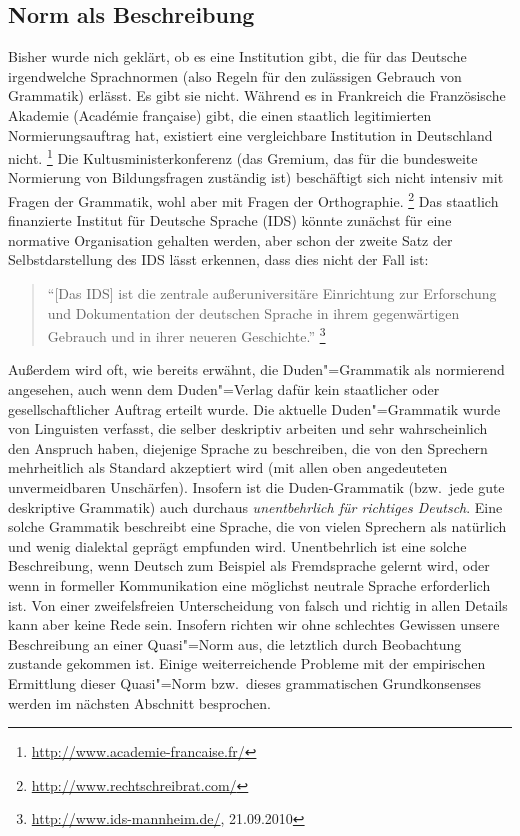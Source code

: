 \subsection{Norm als Beschreibung}

\label{sec:normalsbeschreibung}

Bisher wurde nich geklärt, ob es eine Institution gibt, die für das Deutsche irgendwelche Sprachnormen (also Regeln für den zulässigen Gebrauch von Grammatik) erlässt.
Es gibt sie nicht.
Während es \zB in Frankreich die Französische Akademie (Académie française) gibt, die einen staatlich legitimierten Normierungsauftrag hat, existiert eine vergleichbare Institution in Deutschland nicht.%
\footnote{\raggedright{\url{http://www.academie-francaise.fr/}}}
Die Kultusministerkonferenz (das Gremium, das für die bundesweite Normierung von Bildungsfragen zuständig ist) beschäftigt sich nicht intensiv mit Fragen der Grammatik, wohl aber mit Fragen der Orthographie.%
\footnote{\url{http://www.rechtschreibrat.com/}}
Das staatlich finanzierte Institut für Deutsche Sprache (IDS) könnte zunächst für eine normative Organisation gehalten werden, aber schon der zweite Satz der Selbstdarstellung des IDS lässt erkennen, dass dies nicht der Fall ist:

\begin{quote}
  "`[Das IDS] ist die zentrale außeruniversitäre Einrichtung zur Erforschung und Dokumentation der deutschen Sprache in ihrem gegenwärtigen Gebrauch und in ihrer neueren Geschichte."'%
    \footnote{\raggedright{\url{http://www.ids-mannheim.de/}, 21.09.2010}}
\end{quote}

Außerdem wird oft, wie bereits erwähnt, die Duden"=Grammatik als normierend angesehen, auch wenn dem Duden"=Verlag dafür kein staatlicher oder gesellschaftlicher Auftrag erteilt wurde.
Die aktuelle Duden"=Grammatik wurde von Linguisten verfasst, die selber deskriptiv arbeiten und sehr wahrscheinlich den Anspruch haben, diejenige Sprache zu beschreiben, die von den Sprechern mehrheitlich als Standard akzeptiert wird (mit allen oben angedeuteten unvermeidbaren Unschärfen).
Insofern ist die Duden-Grammatik (bzw.\ jede gute deskriptive Grammatik) auch durchaus \textit{unentbehrlich für richtiges Deutsch}.
Eine solche Grammatik beschreibt eine Sprache, die von vielen Sprechern als natürlich und wenig dialektal geprägt empfunden wird.
Unentbehrlich ist eine solche Beschreibung, wenn Deutsch zum Beispiel als Fremdsprache gelernt wird, oder wenn in formeller Kommunikation eine möglichst neutrale Sprache erforderlich ist.
Von einer zweifelsfreien Unterscheidung von falsch und richtig in allen Details kann aber keine Rede sein.
Insofern richten wir ohne schlechtes Gewissen unsere Beschreibung an einer Quasi"=Norm aus, die letztlich durch Beobachtung zustande gekommen ist.
Einige weiterreichende Probleme mit der empirischen Ermittlung dieser Quasi"=Norm bzw.\ dieses grammatischen Grundkonsenses werden im nächsten Abschnitt besprochen. 

